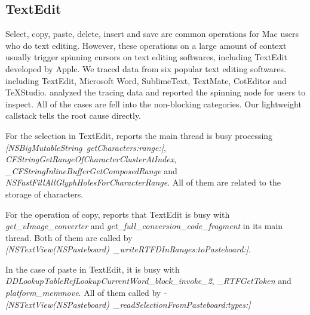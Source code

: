 \subsection{TextEdit}

Select, copy, paste, delete, insert and save are common operations for Mac
users who do text editing. However, these operations on a large amount of
context usually trigger spinning cursors on text editing softwares, including
TextEdit developed by Apple. We traced data from six popular text editing
softwares. including TextEdit, Microsoft Word, SublimeText, TextMate, CotEditor
and TeXStudio. \xxx analyzed the tracing data and reported the spinning node for
users to inspect. All of the cases are fell into the non-blocking categories.
Our lightweight callstack tells the root cause directly.

For the selection in TextEdit, \xxx reports the main thread is busy
processing \textit{[NSBigMutableString\ getCharacters:range:]},
\textit{CFStringGetRangeOfCharacterClusterAtIndex},
\textit{\_CFStringInlineBufferGetComposedRange} and
\textit{NSFastFillAllGlyphHolesForCharacterRange}. All of them are related to
the storage of characters.

For the operation of copy, \xxx reports that TextEdit
is busy with \textit{get\_vImage\_converter} and
\textit{get\_full\_conversion\_code\_fragment} in its main thread.
Both of them are called by \textit{[NSTextView(NSPasteboard)\
\_writeRTFDInRanges:toPasteboard:]}.

In the case of paste in TextEdit, it is busy with
\textit{DDLookupTableRefLookupCurrentWord\_block\_invoke\_2},
\textit{\_RTFGetToken} and \textit{platform\_memmove}. All of them called by
\textit{-[NSTextView(NSPasteboard)\ \_readSelectionFromPasteboard:types:]}
